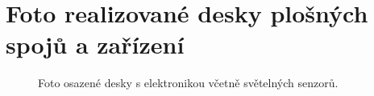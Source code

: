 \chapter{Foto realizované desky plošných spojů a zařízení}
\begin{figure}[h]
	\centering
	\quad
	\caption{Foto osazené desky s elektronikou včetně světelných senzorů.}
	\label{fig_finalPCB}
\end{figure}


